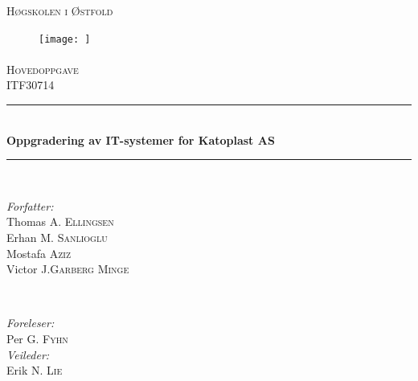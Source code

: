 \newcommand{\HRule}{\rule{\linewidth}{0.5mm}} %

\center %
 

\textsc{\LARGE Høgskolen i Østfold}\\[0cm] %
\begin{figure}[H]
\centering
\texttt{[image: ]}
\end{figure}
\paragraph{}
\textsc{\Large Hovedoppgave}\\[0.5cm] %
\textsc{\large ITF30714}\\[0.5cm] %


\HRule \\[0.4cm]
{ \huge \bfseries Oppgradering av IT-systemer for Katoplast AS}\\[0.4cm] %
\HRule \\[1.5cm]
 

\begin{minipage}{0.4\textwidth}
\begin{flushleft} \large
\emph{Forfatter:}\\
Thomas A. \textsc{Ellingsen}\\
Erhan M. \textsc{Sanlioglu}\\
Mostafa \textsc{Aziz}\\
Victor J.\textsc{Garberg Minge}
\end{flushleft}
\end{minipage}
~
\begin{minipage}{0.4\textwidth}
\begin{flushright} \large
\emph{Foreleser:}\\
Per G. \textsc{Fyhn}\\
\emph{Veileder:} \\
Erik N. \textsc{Lie}\\
\end{flushright}
\end{minipage}\\[2cm]

